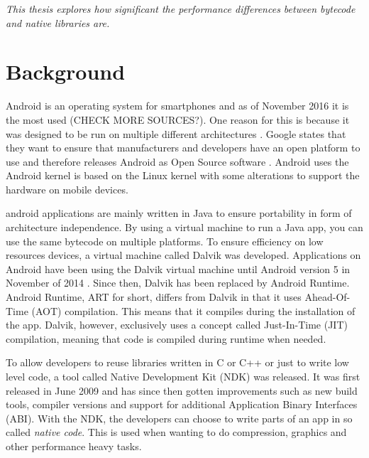 
\textit{This thesis explores how significant the performance differences between bytecode and native libraries are.}


\section{Background}
Android is an operating system for smartphones and as of November 2016 it is the most used (CHECK MORE SOURCES?)\cite{android:os:popularity}. One reason for this is because it was designed to be run on multiple different architectures \cite{android:os:devices}. Google states that they want to ensure that manufacturers and developers have an open platform to use and therefore releases Android as Open Source software \cite{android:os:opensource}. Android uses the Android kernel is based on the Linux kernel with some alterations to support the hardware on mobile devices.


\gls{android} applications are mainly written in Java to ensure portability in form of architecture independence. By using a virtual machine to run a Java app, you can use the same bytecode on multiple platforms. To ensure efficiency on low resources devices, a virtual machine called Dalvik was developed. Applications on Android have been using the Dalvik virtual machine until Android version 5 \cite{android:dalvik} in November of 2014 \cite{android:dalvik:release}. Since then, Dalvik has been replaced by Android Runtime. Android Runtime, ART for short, differs from Dalvik in that it uses Ahead-Of-Time (AOT) compilation. This means that it compiles during the installation of the app. Dalvik, however, exclusively uses a concept called Just-In-Time (JIT) compilation, meaning that code is compiled during runtime when needed.


To allow developers to reuse libraries written in C or C++ or just to write low level code, a tool called Native Development Kit (NDK) was released. It was first released in June 2009 \cite{Lin2011} and has since then gotten improvements such as new build tools, compiler versions and support for additional Application Binary Interfaces (ABI). With the NDK, the developers can choose to write parts of an app in so called \emph{native code}. This is used when wanting to do compression, graphics and other performance heavy tasks.

